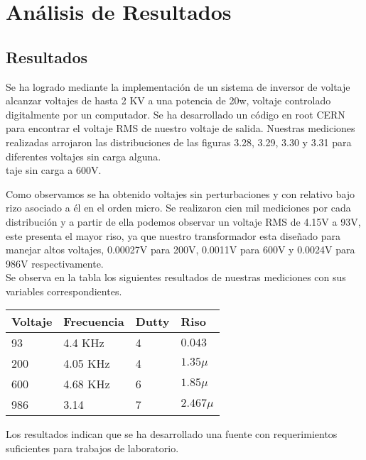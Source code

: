 \chapter{Análisis de Resultados}
\section{Resultados}

Se ha logrado mediante la implementación de un sistema de inversor de voltaje alcanzar voltajes de hasta 2 KV a una potencia de 20w, voltaje controlado digitalmente por un computador. Se ha desarrollado un código en root CERN para encontrar el voltaje RMS de nuestro voltaje de salida. Nuestras mediciones realizadas arrojaron las  distribuciones de las figuras 3.28, 3.29, 3.30 y 3.31 para diferentes voltajes sin carga alguna. \\
taje sin carga a 600V.


Como observamos se ha obtenido voltajes sin perturbaciones y con relativo bajo rizo asociado a él en el orden micro. Se realizaron cien mil mediciones por cada distribución y a partir de ella podemos observar un voltaje RMS de 4.15V a 93V, este presenta el mayor riso, ya que nuestro transformador esta diseñado para manejar altos voltajes, 0.00027V para 200V, 0.0011V para 600V y 0.0024V para 986V respectivamente. \\

Se observa en la tabla los siguientes resultados de nuestras mediciones con sus variables correspondientes. 

\begin{table}[H]
\begin{tabular}{@{}llll@{}}
\toprule
Voltaje   & Frecuencia & Dutty & Riso \\ \midrule
93  & 4.4 KHz        & 4   & $0.043$\\
200 & 4.05 KHz        & 4   &   $1.35\mu$ \\
600 & 4.68 KHz        & 6   &   $1.85\mu$ \\
986 & 3.14        & 7   &   $2.467 \mu$ \\ \bottomrule
\end{tabular}
\end{table}


Los resultados indican que se ha desarrollado una fuente con requerimientos suficientes para trabajos de laboratorio. 